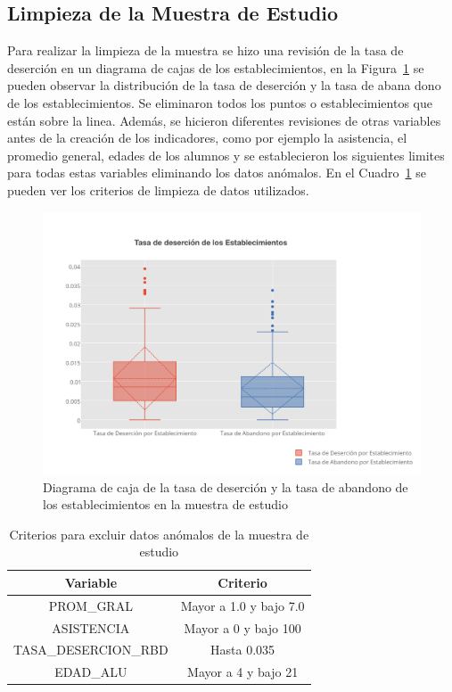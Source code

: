 \subsection{Limpieza de la Muestra de Estudio}
Para realizar la limpieza de la muestra se hizo una revisión de la tasa de deserción en un diagrama de cajas de los establecimientos, en la Figura~\ref{fig:boxplotdes} se pueden observar la distribución de la tasa de deserción y la tasa de abana dono de los establecimientos. Se eliminaron todos los puntos o establecimientos que están sobre la linea. Además, se hicieron diferentes revisiones de otras variables antes de la creación de los indicadores, como por ejemplo la asistencia, el promedio general, edades de los alumnos y se establecieron los siguientes limites para todas estas variables eliminando los datos anómalos. En el Cuadro~\ref{tab:cedam} se pueden ver los criterios de limpieza de datos utilizados.
\begin{figure}[]
  \centering
    \includegraphics[trim=0cm 0cm 0cm 0cm,scale=0.9]{Figuras/6SolucionPropuesta/esm.png}
      \caption{Diagrama de caja de la tasa de deserción y la tasa de abandono de los establecimientos en la muestra de estudio}
    \label{fig:boxplotdes}
\end{figure}
\begin{table}[]
\centering
\begin{tabular}{|c|c|}
\hline
\textbf{Variable} & \textbf{Criterio} \\ \hline
PROM\_GRAL & Mayor a 1.0 y bajo 7.0 \\ \hline
ASISTENCIA & Mayor a 0 y bajo 100 \\ \hline
TASA\_DESERCION\_RBD & Hasta 0.035 \\ \hline
EDAD\_ALU & Mayor a 4 y bajo 21 \\ \hline
\end{tabular}
\caption{Criterios para excluir datos anómalos de la muestra de estudio}
\label{tab:cedam}
\end{table}

